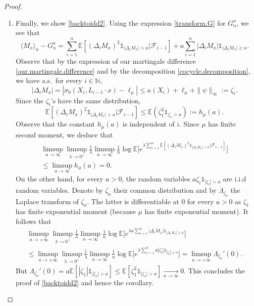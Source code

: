 \documentclass[10pt]{amsart}
\newenvironment{enumeratei}
{\bgroup\def\theenumi{\roman{enumi}}\def\theenumii{\arabic{enumii}}\begin{enumerate}}
{\end{enumerate}\egroup}
\theoremstyle{plain}
\theoremstyle{definition}
\newcommand\E{\mathbb{E}}
\newcommand\N{\mathbb{N}}
\begin{document}
\begin{proof}
\begin{enumeratei}
\item
Finally, we show \eqref{backtoidd2}. Using the expression \eqref{transform.G} for $G_n^a$, we see that
\[
\langle M_x \rangle_n - G_n^a = \sum_{i=1}^n{\E[(\Delta_i M_x)^2 \mathds{1}_{|\Delta_i M_x|>a} | \mathcal{F}_{i-1}] + a \sum_{i=1}^n{|\Delta_i M_x|} \mathds{1}_{|\Delta_i M_x|\geq a}}.
\]
Observe that by the expression of
our martingale difference \eqref{our.martingale.difference} and by the decomposition \eqref{cocycle.decomposition},
we have a.s.~for every $i\in \N$,
\begin{equation}\label{equation.upper.MDS}|\Delta_i M_x|= |\sigma_0(X_i, L_{i-1}\cdot x)-\ell_\mu|\leq
\kappa(X_i)+\ell_\mu+\|\psi\|_{\infty}:=\zeta_i.\end{equation}
Since the $\zeta_i$'s have the same distribution,
\[
\E[(\Delta_i M_x)^2 \mathds{1}_{|\Delta_i M_x|>a} | \mathcal{F}_{i-1}]\leq \E(\zeta_1^2 \mathds{1}_{\zeta_1>a}):=h_{\mu}(a).
\]
Observe that the constant $h_{\mu}(a)$ is independent of $i$. Since $\mu$ has finite second moment, we deduce that
\begin{multline}\label{quedire1}
\limsup_{a \to \infty}\limsup_{\lambda \to 0^+}\frac{1}{\lambda} \limsup_{n\to \infty} \frac{1}{n} \log \E\bigl[e^{\lambda \sum_{i=1}^n \mathbb{E}[(\Delta_i M_x)^2 \mathds{1}_{|\Delta_i M_x|>a} | \mathcal{F}_{i-1}]}\bigr]\\
\leq \limsup_{a\to \infty}{h_{\mu}(a)}=0.
\end{multline}
On the other hand, for every $a>0$, the random variables $a\zeta_i\mathds{1}_{|\zeta_i|>a}$ are i.i.d random variables. Denote by $\zeta_a$ their common distribution and by $\Lambda_{\zeta_a}$ the Laplace transform of $\zeta_a$. The latter is differentiable at $0$ for every $a>0$ as $\zeta_1$ has finite exponential moment (because $\mu$ has finite exponential moment).
It follows that
\begin{multline}\label{link}
\limsup_{a\to +\infty} \limsup_{\lambda \to 0^+}\frac{1}{\lambda} \limsup_{n\to \infty} \frac{1}{n} \log \E\bigl[e^{\lambda a \sum_{i=1}^n{|\Delta_i M_x| \mathds{1}_{|\Delta_i M_x|\geq a}}}\bigr]\\
\leq 
\limsup_{a\to +\infty} \limsup_{\lambda \to 0^+}\frac{1}{\lambda} \limsup_{n\to \infty} \frac{1}{n} \log \E\bigl[e^{\lambda \sum_{i=1}^n{ a |\zeta_i| \mathds{1}_{|\zeta_i|\geq a}}}\bigr] =
\limsup_{a\to +\infty} \Lambda_{\zeta_a}'(0).
\end{multline}
But $\Lambda_{\zeta_a}'(0)=a\E[|\zeta_1| \mathds{1}_{|\zeta_1|>a}]\leq \E[\zeta_1^2 \mathds{1}_{|\zeta_1|>a}]\xrightarrow[a\to \infty]{} 0$. This concludes the proof of \eqref{backtoidd2} and hence the corollary.\qedhere
\end{enumeratei}
\end{proof}
\end{document}
